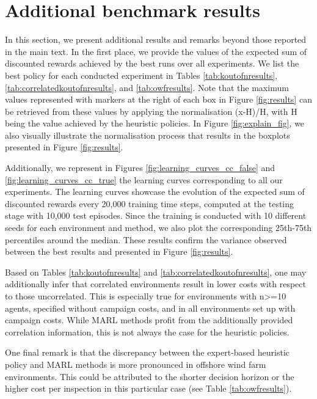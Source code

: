 \section{Additional benchmark results}
\label{app:add_results}
In this section, we present additional results and remarks beyond those reported in the main text.
In the first place, we provide the values of the expected sum of discounted rewards achieved by the best runs over all experiments.
We list the best policy for each conducted experiment in Tables \ref{tab:koutofnresults}, \ref{tab:correlatedkoutofnresults}, and \ref{tab:owfresults}.
Note that the maximum values represented with markers at the right of each box in Figure \ref{fig:results} can be retrieved from these values by applying the normalisation (x-H)/H, with H being the value achieved by the heuristic policies.
In Figure \ref{fig:explain_fig}, we also visually illustrate the normalisation process that results in the boxplots presented in Figure \ref{fig:results}.

Additionally, we represent in Figures \ref{fig:learning_curves_cc_false} and \ref{fig:learning_curves_cc_true} the learning curves corresponding to all our experiments.
The learning curves showcase the evolution of the expected sum of discounted rewards every 20,000 training time steps, computed at the testing stage with 10,000 test episodes.
Since the training is conducted with 10 different seeds for each environment and method, we also plot the corresponding 25th-75th percentiles around the median.
These results confirm the variance observed between the best results and presented in Figure \ref{fig:results}.

Based on Tables \ref{tab:koutofnresults} and \ref{tab:correlatedkoutofnresults}, one may additionally infer that correlated environments result in lower costs with respect to those uncorrelated.
This is especially true for environments with n>=10 agents, specified without campaign costs, and in all environments set up with campaign costs.
While MARL methods profit from the additionally provided correlation information, this is not always the case for the heuristic policies.

One final remark is that the discrepancy between the expert-based heuristic policy and MARL methods is more pronounced in offshore wind farm environments. 
This could be attributed to the shorter decision horizon or the higher cost per inspection in this particular case (see Table \ref{tab:owfresults}).

